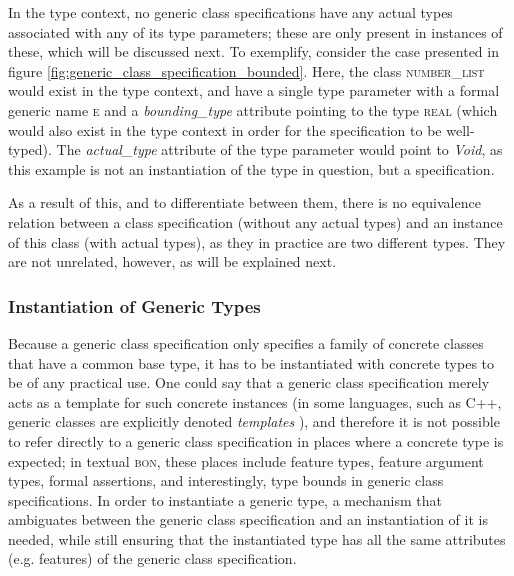 In the type context, no generic class specifications have any actual types associated with any of its type parameters; these are only present in instances of these, which will be discussed next. To exemplify, consider the case presented in figure \ref{fig:generic_class_specification_bounded}. Here, the class \textsc{number\_list} would exist in the type context, and have a single type parameter with a formal generic name \textsc{e} and a \textit{bounding\_type} attribute pointing to the type \textsc{real} (which would also exist in the type context in order for the specification to be well-typed). The \textit{actual\_type} attribute of the type parameter would point to \textit{Void}, as this example is not an instantiation of the type in question, but a specification.

As a result of this, and to differentiate between them, there is no equivalence relation between a class specification (without any actual types) and an instance of this class (with actual types), as they in practice are two different types. They are not unrelated, however, as will be explained next.
\subsubsection{Instantiation of Generic Types}
Because a generic class specification only specifies a family of concrete classes that have a common base type,  it has to be instantiated with concrete types to be of any practical use.  One could say that a generic class specification merely acts as a template for such concrete instances (in some languages, such as C++, generic classes are explicitly denoted \textit{templates} \cite{stroustrup1997}), and therefore it is not possible to refer directly to a generic class specification in places where a concrete type is expected; in textual \textsc{bon}, these places include feature types, feature argument types, formal assertions, and interestingly, type bounds in generic class specifications. In order to instantiate a generic type, a mechanism that ambiguates between the generic class specification and an instantiation of it is needed, while still ensuring that the instantiated type has all the same attributes (e.g. features) of the generic class specification.
